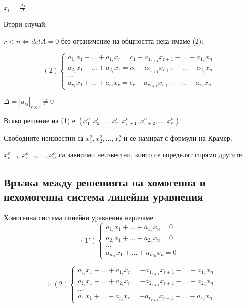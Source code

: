 \documentclass[fleqn,12pt]{article}
\begin{document}
\begin{flushleft}
    $ x_i = \frac{\Delta i}{\Delta} $

    \vspace{5mm}

    Втори случай:

    $ r < n \Leftrightarrow detA = 0 $ без ограничение на общността нека имаме (2):

    \begin{equation*}
        (2)\begin{cases}
            a_{1_1}x_1+\dots+a_{1_r}x_r = c_1 - a_{1_{r+1}}x_{r+1} - \dots - a_{1_n}x_n\\
            a_{2_1}x_1+\dots+a_{2_r}x_r = c_2 - a_{2_{r+1}}x_{r+1} - \dots - a_{2_n}x_n\\
            \dots\\
            a_{r_1}x_1+\dots+a_{r_r}x_r = c_r - a_{r_{r+1}}x_{r+1} - \dots - a_{r_n}x_n
        \end{cases}
    \end{equation*}

    $ \Delta = | a_{ij} |_{r \times r} \neq 0 $

    Всяко решение на (1) е $ ( x_1^o, x_2^o, \dots, x_r^o, x_{r+1}^o, x_{r+2}^o, \dots, x_n^o ) $

    Свободните неизвестни са $ x_1^o, x_2^o, \dots, x_r^o $ и се намират с формули на Крамер.

    $x_{r+1}^o, x_{r+2}^o, \dots, x_n^o $ са зависими неизвестни, които се определят спрямо другите.


\subsection{Връзка между решенията на хомогенна и нехомогенна система линейни уравнения}
Хомогенна система линейни уравнения наричаме
\begin{equation*}
    (1')\begin{cases}
        a_{1_1}x_1+\dots+a_{1_n}x_n = 0\\
        a_{2_1}x_1+\dots+a_{2_n}x_n = 0\\
        \dots\\
        a_{m_1}x_1+\dots+a_{m_n}x_n = 0
    \end{cases}
\end{equation*}

\begin{equation*}
    \Rightarrow(2)\begin{cases}
        a_{1_1}x_1+\dots+a_{1_r}x_r = - a_{1_{r+1}}x_{r+1} - \dots - a_{1_n}x_n\\
        a_{2_1}x_1+\dots+a_{2_r}x_r = - a_{2_{r+1}}x_{r+1} - \dots - a_{2_n}x_n\\
        \dots\\
        a_{r_1}x_1+\dots+a_{r_r}x_r = - a_{r_{r+1}}x_{r+1} - \dots - a_{r_n}x_n
    \end{cases}
\end{equation*}


\end{flushleft}
\end{document}
